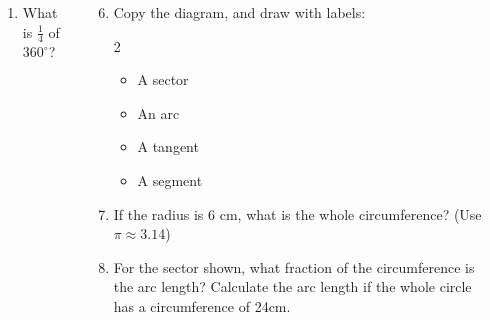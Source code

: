 \documentclass{beamer}
\newcommand{\ashow}[1]{\uncover<2->{\textcolor{red}{\small #1}}}
\begin{document}
\begin{frame}
\begin{columns}
\begin{center}
\begin{tikzpicture}[scale=1]
\end{tikzpicture}

\end{center}


\small
\begin{enumerate}
  \item What is $\frac{1}{4}$ of $360^\circ$? \ashow{$90^\circ$}
\end{enumerate}

\begin{enumerate}
  \setcounter{enumi}{5}
  \item Copy the diagram, and draw with labels:
    \begin{multicols}{2}
    \begin{itemize}
      \item A sector
      \item An arc
      \item A tangent
      \item A segment
    \end{itemize}
    \end{multicols}
  \item If the radius is $6$ cm, what is the whole circumference? (Use $\pi \approx 3.14$) \ashow{$37.68$ cm}
  \item For the sector shown, what fraction of the circumference is the arc length? Calculate the arc length if the whole circle has a circumference of 24cm. \ashow{$\frac{1}{6}$; $4$ cm}

\end{enumerate}

\end{columns}
\end{frame}
\end{document}
